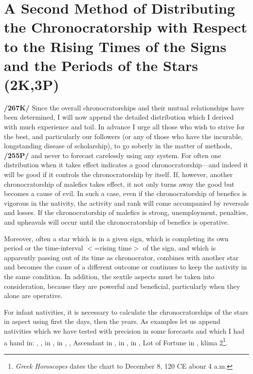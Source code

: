 \section{A Second Method of Distributing the Chronocratorship with Respect to the Rising Times of the Signs and the Periods of the Stars (2K,3P)}

\textbf{/267K/} Since the overall chronocratorships and their mutual relationships have been determined, I will now append the detailed distribution which I derived with much experience and toil. In advance I urge all those who wish to strive for the best, and particularly our followers (or any of those who have the incurable, longstanding
disease of scholarship), to go soberly in the matter of methods, \textbf{/255P/} and never to forecast carelessly using any system. For often one distribution when it takes effect indicates a good chronocratorship—and indeed it will be good if it controls the chronocratorship by itself. If, however, another chronocratorship of malefics takes effect, it not only turns away the good but becomes a cause of evil. In such a case, even if the chronocratorship of benefics is vigorous in the nativity, the activity and rank will come accompanied by reversals and losses. If the chronocratorship of malefics is strong,
unemployment, penalties, and upheavals will occur until the chronocratorship of benefics is operative.

Moreover, often a star which is in a given sign, which is completing its own period or the time-interval $<$=rising time$>$ of the sign, and which is apparently passing out of its time as chronocrator, combines with another star and becomes the cause of a different outcome or continues to keep the nativity in the same condition. In addition, the sextile aspects must be taken into consideration, because they are powerful and beneficial, particularly when they alone are operative. 

For infant nativities, it is necessary to calculate the chronocratorships of the stars in aspect using first the days, then the years. As examples let us append nativities which we have tested with precision in some forecasts and which I had a hand in: \Sun, \Moon, \Mercury\xspace in \Sagittarius, \Saturn\xspace in \Cancer, \Jupiter, Ascendant in \Scorpio, \Mars\xspace in \Capricorn, \Venus\xspace in \Aquarius, Lot of Fortune in \Scorpio, klima 2\footnote{\textit{Greek Horoscopes} dates the chart to December 8, 120 CE abour 4 a.m.}. 

